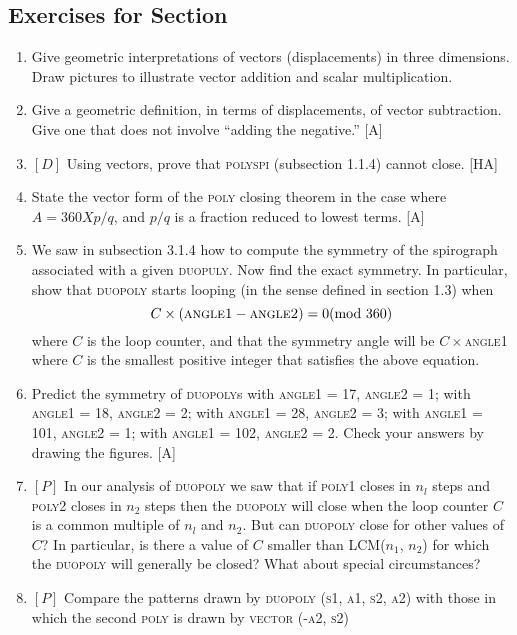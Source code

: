 \documentclass{book}
\begin{document}
\subsection{Exercises for Section \thesection}
\begin{enumerate}
\item Give geometric interpretations of vectors (displacements) in three
dimensions. Draw pictures to illustrate vector addition and scalar multiplication.
\item Give a geometric definition, in terms of displacements, of vector
subtraction. Give one that does not involve ``adding the negative.'' [A]
\item $[D]$ Using vectors, prove that \textsc{polyspi} (subsection 1.1.4) cannot close.
[HA]
\item State the vector form of the \textsc{poly} closing theorem in the case where
$A = 360 X p/ q$, and $p/q$ is a fraction reduced to lowest terms. [A]
\item We saw in subsection 3.1.4 how to compute the symmetry of the
spirograph associated with a given \textsc{duopuly}. Now find the exact symmetry. In particular, show that \textsc{duopoly} starts looping (in the sense
defined in section 1.3) when
$$C \times ( \text{\textsc{angle1}} - \text{\textsc{angle2}}) = 0 \text{(mod 360)}$$
where $C$ is the loop counter, and that the symmetry angle will be $C \times $\textsc{angle1} where $C$ is the smallest positive integer that satisfies the above
equation.  
\item Predict the symmetry of \textsc{duopoly}s with \textsc{angle1} = 17, \textsc{angle2} = 1;
with \textsc{angle1} = 18, \textsc{angle2} = 2; with \textsc{angle1} = 28, \textsc{angle2} = 3; with
\textsc{angle1} = 101, \textsc{angle2} = 1; with \textsc{angle1} = 102, \textsc{angle2} = 2. Check
your answers by drawing the figures. [A]
\item $[P]$ In our analysis of \textsc{duopoly} we saw that if \textsc{poly1} closes in $n_l$
steps and \textsc{poly2} closes in $n_2$ steps then the \textsc{duopoly} will close when the
loop counter $C$ is a common multiple of $n_l$ and $n_2$. But can \textsc{duopoly}
close for other values of $C$? In particular, is there a value of $C$ smaller
than LCM($n_1$, $n_2$) for which the \textsc{duopoly} will generally be closed? What
about special circumstances?
\item $[P]$ Compare the patterns drawn by \textsc{duopoly (s1, a1, s2, a2)}
with those in which the second \textsc{poly} is drawn by \textsc{vector (-a2, s2)}

\end{enumerate}
\end{document}

